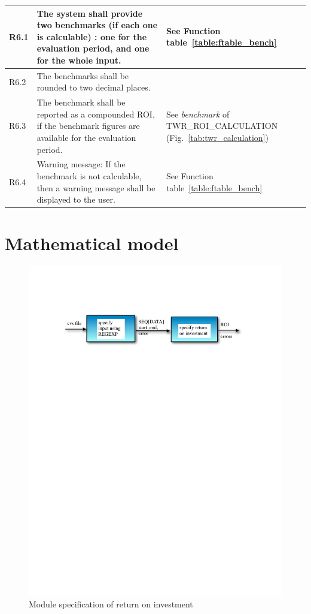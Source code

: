 \documentclass[runningheads,12pt]{article}
\begin{document}
{\begin{longtable}{|l|p{9cm}|p{5cm}|}
\hline
R6.1 & The system shall provide two benchmarks (if each one is calculable) : one for the evaluation period, and one for the whole input. & See Function table~\ref{table:ftable_bench}\\

\hline
R6.2 &  The benchmarks shall be rounded to two decimal places. & \\

\hline
R6.3 & The benchmark shall be reported as a compounded ROI, if the benchmark figures are available for the evaluation period. & See \textit{benchmark} of TWR\_ROI\_CALCULATION (Fig.~\ref{tab:twr_calculation})\\

\hline
R6.4 & Warning message: If the benchmark is not calculable, then a warning message shall be displayed to the user. & See Function table~\ref{table:ftable_bench}\\



\hline
\end{longtable}
}


\section{Mathematical model}


\begin{figure}
\centering
\includegraphics[scale=0.8]{inputs/spec.pdf}

\caption{Module specification of return on investment}
\end{figure}
\end{document}
